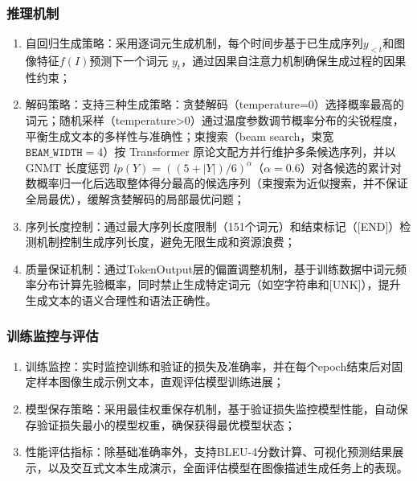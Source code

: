 \subsubsection{推理机制}
\begin{enumerate}[label={（\arabic*）}, leftmargin=2em, labelsep=0.5em, itemsep=0pt]
    \item 自回归生成策略：采用逐词元生成机制，每个时间步基于已生成序列$y_{<t}$和图像特征$f(I)$预测下一个词元 $y_t$，通过因果自注意力机制确保生成过程的因果性约束；
    \item 解码策略：支持三种生成策略：贪婪解码（temperature=0）选择概率最高的词元；随机采样（temperature>0）通过温度参数调节概率分布的尖锐程度，平衡生成文本的多样性与准确性；束搜索（beam search，束宽 $\texttt{BEAM\_WIDTH}=4$）按 Transformer 原论文配方\supercite{vaswaniAttentionAllYou2017}并行维护多条候选序列，并以 GNMT 长度惩罚\supercite{wuGoogleNeuralMachine2016} $lp(Y)=\left((5+|Y|)/6\right)^{\alpha}$（$\alpha=0.6$）对各候选的累计对数概率归一化后选取整体得分最高的候选序列（束搜索为近似搜索，并不保证全局最优），缓解贪婪解码的局部最优问题；
    \item 序列长度控制：通过最大序列长度限制（151个词元）和结束标记（[END]）检测机制控制生成序列长度，避免无限生成和资源浪费；
    \item 质量保证机制：通过TokenOutput层的偏置调整机制，基于训练数据中词元频率分布计算先验概率，同时禁止生成特定词元（如空字符串和[UNK]），提升生成文本的语义合理性和语法正确性。
\end{enumerate}

\subsubsection{训练监控与评估}
\begin{enumerate}[label={（\arabic*）}, leftmargin=2em, labelsep=0.5em, itemsep=0pt]
    \item 训练监控：实时监控训练和验证的损失及准确率，并在每个epoch结束后对固定样本图像生成示例文本，直观评估模型训练进展；
    \item 模型保存策略：采用最佳权重保存机制，基于验证损失监控模型性能，自动保存验证损失最小的模型权重，确保获得最优模型状态；
    \item 性能评估指标：除基础准确率外，支持BLEU-4分数计算、可视化预测结果展示，以及交互式文本生成演示，全面评估模型在图像描述生成任务上的表现。
\end{enumerate}